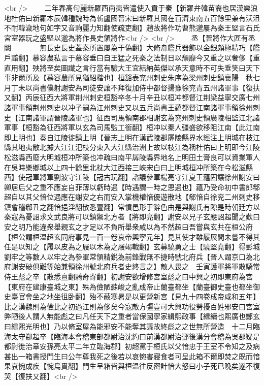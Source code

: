 <br />
　　二年春高句麗新羅西南夷皆遣使入貢于秦【新羅弁韓苗裔也居漢樂浪地杜佑曰新羅本辰韓種魏時為斬盧國晉宋曰新羅其國在百濟東南五百餘里兼有沃沮不耐韓濊地句如字又音駒麗力知翻使疏吏翻】趙故將作功曹熊邈屢為秦王堅言石氏宮室器玩之盛堅以邈為將作長史領將作<br />
<br />
　　丞【晉將作大匠有丞闕　　　　無長史長史蓋秦所置屢為于偽翻】大脩舟艦兵器飾以金銀頗極精巧【艦戶黯翻】慕容農私言于慕容垂曰自王猛之死秦之法制日以頹靡今又重之以奢侈【重直用翻】殃將至矣圖䜟之言行當有驗大王宜結納英傑以承天意時不可失垂笑曰天下事非爾所及【慕容農所見猶紹楷也】桓豁表兖州刺史朱序為梁州刺史鎮襄陽　秋七月丁未以尚書僕射謝安為司徒安讓不拜復加侍中都督揚豫徐兖青五州諸軍事【復扶又翻】丙辰征西大將軍荆州刺史桓豁卒冬十月辛丑以桓冲都督江荆梁益寧交廣七州諸軍事領荆州刺史以冲子嗣為江州刺史又以五兵尚書王藴都督江南諸軍事領徐州刺史【江南諸軍謂晉陵諸軍也】征西司馬領南郡相謝玄為兖州刺史領廣陵相監江北諸軍事【桓豁為征西將軍以玄為司馬監工銜翻】桓冲以秦人彊盛欲移阻江南【此江南即上明也】奏自江陵徙鎮上明【晉志上明在漢武陵郡孱陵縣界水經注上明城在枝江縣其地夷敞北據大江江汜枝分東入大江縣治洲上故以枝江為稱杜佑曰上明即今江陵松滋縣西廢大明城桓冲所築也冲疏曰南平孱陵縣界地名上明田土膏良可以資業軍人在吳時樂鄉城以上四十餘里北枕大江西接三峽宋白曰上明城桓冲所築在今松滋縣西】使冠軍將軍劉波守江陵【冠古玩翻】諮議參軍楊亮守江夏王藴固讓徐州謝安曰卿居后父之重不應妄自菲薄以虧時遇【時遇謂一時之恩遇也】藴乃受命初中書郎郗超自以其父愔位遇應在謝安之右而安入掌機權愔優遊散地【郗愔自徐兖二州刺史移鎮會稽郗丑之翻愔挹淫翻散悉亶翻】常憤邑形于辭色由是與謝氏有隙是時朝廷方以秦寇為憂詔求文武良將可以鎮禦北方者【將即亮翻】謝安以兄子玄應詔超聞之歎曰安之明乃能違衆舉親玄之才足以不負所舉衆咸以為不然超曰吾嘗與玄共在桓公府【桓公謂桓温超玄同府事見一百一卷哀帝興寧元年】見其使才雖履展間未嘗不得其任是以知之【履以皮為之屐以木為之屐竭戟翻】玄募驍勇之士【驍堅堯翻】得彭城劉牢之等數人以牢之為參軍常領精鋭為前鋒戰無不捷時號北府兵【晉人謂京口為北府謝安破俱難等始兼領徐州號北府兵者史終言之】敵人畏之　壬寅護軍將軍散騎常侍王彪之卒【散悉亶翻騎奇寄翻】初謝安欲增修宮室彪之曰中興之初即東府為宮【東府在建康臺城之東】殊為儉陋蘇峻之亂成帝止蘭臺都坐【蘭臺御史臺也都坐御史臺官會坐之地坐徂卧翻】殆不蔽寒暑是以更營新宮【見九十四卷成帝咸和五年】比之漢魏則為儉比之初過江則為侈矣今寇敵方彊豈可大興功役勞擾百姓邪安曰宮室弊陋後人謂人無能彪之曰凡任天下之重者當保國寧家緝熙政事【緝續也熙廣也鄭玄曰緝熙光明也】乃以脩室屋為能邪安不能奪其議故終彪之之世無所營造　十二月臨海太守郗超卒【臨海本會稽東部都尉治沈約曰前漢都尉治鄞後漢分會稽為吳郡疑是都尉徙治章安孫亮太平二年立臨海郡】初超黨于桓氏以父愔忠于王室不令知之及病甚出一箱書授門生曰公年尊我死之後若以哀惋害寢食者可呈此箱不爾即焚之既而愔果哀惋成疾【惋烏貫翻】門生呈箱皆與桓温往反密計愔大怒曰小子死已晩矣遂不復哭【復扶又翻】<br />
